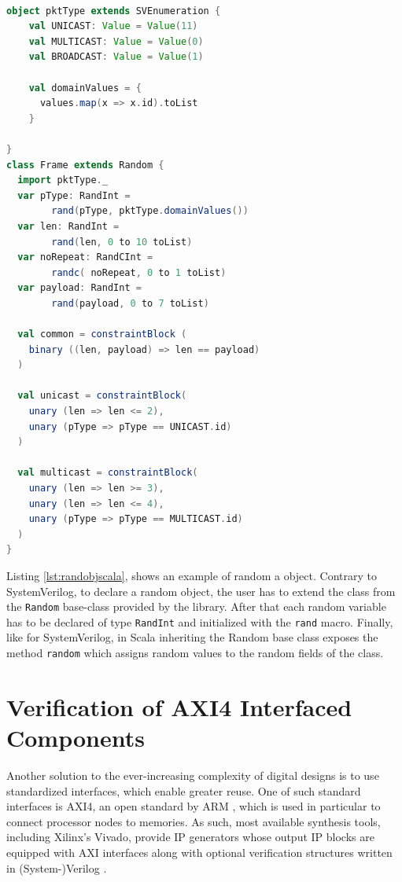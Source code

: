 \documentclass[runningheads]{llncs}
\newcommand{\code}[1]{{\small{\texttt{#1}}}}
\begin{document}
\begin{lstlisting}[language=scala, caption={Random object in Scala}, label={lst:randobjscala}]

object pktType extends SVEnumeration {
    val UNICAST: Value = Value(11)
    val MULTICAST: Value = Value(0)
    val BROADCAST: Value = Value(1)
    
    val domainValues = {
      values.map(x => x.id).toList
    }

}
class Frame extends Random {
  import pktType._
  var pType: RandInt = 
        rand(pType, pktType.domainValues())
  var len: RandInt = 
        rand(len, 0 to 10 toList)
  var noRepeat: RandCInt = 
        randc( noRepeat, 0 to 1 toList)
  var payload: RandInt =
        rand(payload, 0 to 7 toList)

  val common = constraintBlock (
    binary ((len, payload) => len == payload)
  )

  val unicast = constraintBlock(
    unary (len => len <= 2),
    unary (pType => pType == UNICAST.id)
  )

  val multicast = constraintBlock(
    unary (len => len >= 3),
    unary (len => len <= 4),
    unary (pType => pType == MULTICAST.id)
  )
}
\end{lstlisting}

Listing \ref{lst:randobjscala}, shows an example of random a object. Contrary to SystemVerilog, to declare a random object, the user has to extend
the class from the \code{Random} base-class provided by the library. After that each random variable has to be declared of type \code{RandInt} and initialized
with the \code{rand} macro. Finally, like for SystemVerilog, in Scala inheriting the Random base class exposes the method \code{random} which assigns random
values to the random fields of the class.

\section{Verification of AXI4 Interfaced Components}

Another solution to the ever-increasing complexity of digital designs is to use standardized interfaces,
which enable greater reuse. One of such standard interfaces is AXI4, an open standard by ARM \cite{axi4standard},
which is used in particular to connect processor nodes to memories.
As such, most available synthesis tools, including Xilinx's Vivado,
provide IP generators whose output IP blocks are equipped with AXI interfaces
along with optional verification structures written in (System-)Verilog \cite{axi4vip}.
\end{document}
